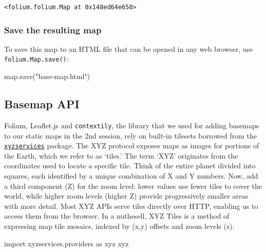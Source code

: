 \documentclass[
  letterpaper,
  DIV=11,
  numbers=noendperiod]{scrreprt}
\newenvironment{Shaded}{\begin{snugshade}}{\end{snugshade}}
\newcommand{\BuiltInTok}[1]{\textcolor[rgb]{0.00,0.23,0.31}{#1}}
\newcommand{\ImportTok}[1]{\textcolor[rgb]{0.00,0.46,0.62}{#1}}
\newcommand{\NormalTok}[1]{\textcolor[rgb]{0.00,0.23,0.31}{#1}}
\newcommand{\StringTok}[1]{\textcolor[rgb]{0.13,0.47,0.30}{#1}}
\begin{document}
\begin{verbatim}
<folium.folium.Map at 0x148ed64e650>
\end{verbatim}

\hypertarget{save-the-resulting-map}{%
\subsubsection{Save the resulting map}\label{save-the-resulting-map}}

To save this map to an HTML file that can be opened in any web browser,
use \texttt{folium.Map.save()}:

\begin{Shaded}
\begin{Highlighting}[]
\BuiltInTok{map}\NormalTok{.save(}\StringTok{"base{-}map.html"}\NormalTok{)}
\end{Highlighting}
\end{Shaded}

\hypertarget{basemap-api}{%
\subsection{Basemap API}\label{basemap-api}}

Folium, Leaflet.js and \texttt{contextily}, the library that we used for
adding basemaps to our static maps in the 2nd session, rely on built-in
tilesets borrowed from the
\href{https://github.com/geopandas/xyzservices}{\texttt{xyzservices}}
package. The XYZ protocol exposes maps as images for portions of the
Earth, which we refer to as `tiles.' The term `XYZ' originates from the
coordinates used to locate a specific tile. Think of the entire planet
divided into squares, each identified by a unique combination of X and Y
numbers. Now, add a third component (Z) for the zoom level: lower values
use fewer tiles to cover the world, while higher zoom levels (higher Z)
provide progressively smaller areas with more detail. Most XYZ APIs
serve tiles directly over HTTP, enabling us to access them from the
browser. In a nuthesell, XYZ Tiles is a method of expressing map tile
mosaics, indexed by (x,y) offsets and zoom levels (z).

\begin{Shaded}
\begin{Highlighting}[]
\ImportTok{import}\NormalTok{ xyzservices.providers }\ImportTok{as}\NormalTok{ xyz}
\NormalTok{xyz}
\end{Highlighting}
\end{Shaded}
\end{document}
